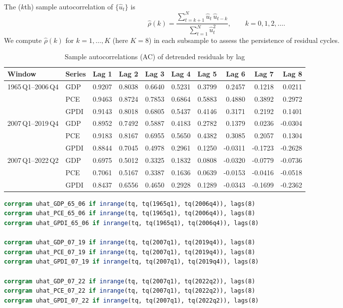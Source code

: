 \documentclass[a4paper,12pt]{article} %
\theoremstyle{nonitalic}
\newenvironment{solution}[1]
  {\renewcommand\theinnercustomsol{#1}%
   \innercustomsol}
  {\endinnercustomsol}
\newcounter{solutionctr}[section]
\renewcommand{\thesolutionctr}{(\alph{solutionctr})}
\newenvironment{autosolution}
  {\refstepcounter{solutionctr}%
   \begin{solution}{\thesolutionctr}}
  {\end{solution}}
\begin{document}
\begin{autosolution}
    \

    The ($k$th) sample autocorrelation of $\{\hat u_t\}$ is
    \[
    \hat\rho(k)
    = \frac{\displaystyle\sum_{t=k+1}^N \hat u_t\,\hat u_{t-k}}
        {\displaystyle\sum_{t=1}^N \hat u_t^2},
    \qquad k=0,1,2,\dots.
    \]
    We compute $\hat\rho(k)$ for $k=1,\dots,K$ (here $K=8$) in each subsample to assess the persistence of residual cycles.
    \begin{table}[ht]
        \centering
        \caption{Sample autocorrelations (AC) of detrended residuals by lag}
        \label{tab:acf_detrended}
        \begin{tabular}{llrrrrrrrr}
        \toprule
        Window & Series & Lag 1 & Lag 2 & Lag 3 & Lag 4 & Lag 5 & Lag 6 & Lag 7 & Lag 8 \\
        \midrule
        \multirow{3}{*}{1965\,Q1--2006\,Q4}
        & GDP  & 0.9207 & 0.8038 & 0.6640 & 0.5231 & 0.3799 & 0.2457 & 0.1218 & 0.0211 \\
        & PCE  & 0.9463 & 0.8724 & 0.7853 & 0.6864 & 0.5883 & 0.4880 & 0.3892 & 0.2972 \\
        & GPDI & 0.9143 & 0.8018 & 0.6805 & 0.5437 & 0.4146 & 0.3171 & 0.2192 & 0.1401 \\
        \midrule
        \multirow{3}{*}{2007\,Q1--2019\,Q4}
        & GDP  & 0.8952 & 0.7492 & 0.5887 & 0.4183 & 0.2782 & 0.1379 & 0.0236 & -0.0304 \\
        & PCE  & 0.9183 & 0.8167 & 0.6955 & 0.5650 & 0.4382 & 0.3085 & 0.2057 &  0.1304 \\
        & GPDI & 0.8844 & 0.7045 & 0.4978 & 0.2961 & 0.1250 & -0.0311 & -0.1723 & -0.2628 \\
        \midrule
        \multirow{3}{*}{2007\,Q1--2022\,Q2}
        & GDP  & 0.6975 & 0.5012 & 0.3325 & 0.1832 & 0.0808 & -0.0320 & -0.0779 & -0.0736 \\
        & PCE  & 0.7061 & 0.5167 & 0.3387 & 0.1636 & 0.0639 & -0.0153 & -0.0416 & -0.0518 \\
        & GPDI & 0.8437 & 0.6556 & 0.4650 & 0.2928 & 0.1289 & -0.0343 & -0.1699 & -0.2362 \\
        \bottomrule
        \end{tabular}
    \end{table}
    \begin{lstlisting}[language=Stata]
corrgram uhat_GDP_65_06 if inrange(tq, tq(1965q1), tq(2006q4)), lags(8)
corrgram uhat_PCE_65_06 if inrange(tq, tq(1965q1), tq(2006q4)), lags(8)
corrgram uhat_GPDI_65_06 if inrange(tq, tq(1965q1), tq(2006q4)), lags(8)

corrgram uhat_GDP_07_19 if inrange(tq, tq(2007q1), tq(2019q4)), lags(8)
corrgram uhat_PCE_07_19 if inrange(tq, tq(2007q1), tq(2019q4)), lags(8)
corrgram uhat_GPDI_07_19 if inrange(tq, tq(2007q1), tq(2019q4)), lags(8)

corrgram uhat_GDP_07_22 if inrange(tq, tq(2007q1), tq(2022q2)), lags(8)
corrgram uhat_PCE_07_22 if inrange(tq, tq(2007q1), tq(2022q2)), lags(8)
corrgram uhat_GPDI_07_22 if inrange(tq, tq(2007q1), tq(2022q2)), lags(8)
    \end{lstlisting}
\end{autosolution}
\end{document}
